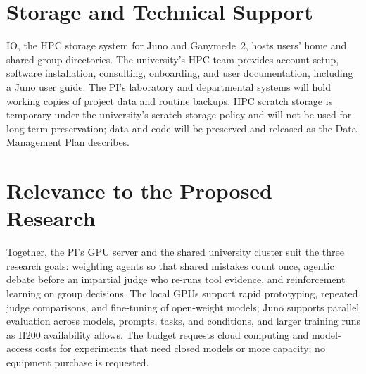 \documentclass[12pt,letterpaper]{article}
\begin{document}
\section*{Storage and Technical Support}
IO, the HPC storage system for Juno and Ganymede~2, hosts users' home and shared group directories. The university's HPC team provides account setup, software installation, consulting, onboarding, and user documentation, including a Juno user guide. The PI's laboratory and departmental systems will hold working copies of project data and routine backups. HPC scratch storage is temporary under the university's scratch-storage policy and will not be used for long-term preservation; data and code will be preserved and released as the Data Management Plan describes.

\section*{Relevance to the Proposed Research}
Together, the PI's GPU server and the shared university cluster suit the three research goals: weighting agents so that shared mistakes count once, agentic debate before an impartial judge who re-runs tool evidence, and reinforcement learning on group decisions. The local GPUs support rapid prototyping, repeated judge comparisons, and fine-tuning of open-weight models; Juno supports parallel evaluation across models, prompts, tasks, and conditions, and larger training runs as H200 availability allows. The budget requests cloud computing and model-access costs for experiments that need closed models or more capacity; no equipment purchase is requested.
\end{document}
